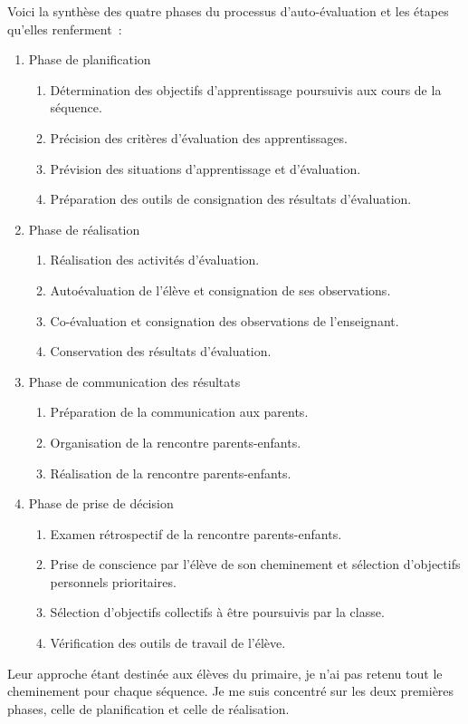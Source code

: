 Voici la synthèse des quatre phases du processus d'auto-évaluation et les étapes qu'elles renferment~:
\begin{enumerate}
\item Phase de planification
	\begin{enumerate}
	\item Détermination des objectifs d'apprentissage poursuivis aux cours de la séquence.
	\item Précision des critères d'évaluation des apprentissages.
	\item Prévision des situations d'apprentissage et d'évaluation.
	\item Préparation des outils de consignation des résultats d'évaluation.
	\end{enumerate}
\item Phase de réalisation
	\begin{enumerate}
	\item Réalisation des activités d'évaluation.
	\item Autoévaluation de l'élève et consignation de ses observations.
	\item Co-évaluation et consignation des observations de l'enseignant.
	\item Conservation des résultats d'évaluation.
	\end{enumerate}
\item Phase de communication des résultats
	\begin{enumerate}
	\item Préparation de la communication aux parents.
	\item Organisation de la rencontre parents-enfants.
	\item Réalisation de la rencontre parents-enfants.
	\end{enumerate}
\item Phase de prise de décision
	\begin{enumerate}
	\item Examen rétrospectif de la rencontre parents-enfants.
	\item Prise de conscience par l'élève de son cheminement et sélection d'objectifs personnels prioritaires.
	\item Sélection d'objectifs collectifs à être poursuivis par la classe.
	\item Vérification des outils de travail de l'élève.
	\end{enumerate}
\end{enumerate}

Leur approche étant destinée aux élèves du primaire, je n'ai pas retenu tout le cheminement pour chaque séquence.
Je me suis concentré sur les deux premières phases, celle de planification et celle de réalisation.


